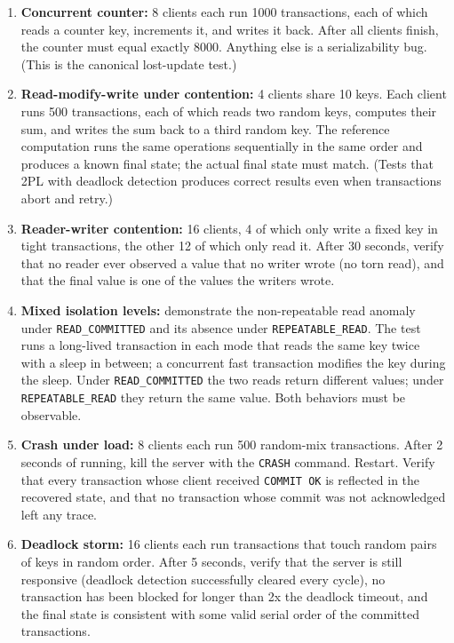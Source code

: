\documentclass[11pt,a4paper]{article}
\begin{document}
\begin{enumerate}
\item \textbf{Concurrent counter:} 8 clients each run 1000 transactions, each of which reads a counter key, increments it, and writes it back. After all clients finish, the counter must equal exactly 8000. Anything else is a serializability bug. (This is the canonical lost-update test.)

\item \textbf{Read-modify-write under contention:} 4 clients share 10 keys. Each client runs 500 transactions, each of which reads two random keys, computes their sum, and writes the sum back to a third random key. The reference computation runs the same operations sequentially in the same order and produces a known final state; the actual final state must match. (Tests that 2PL with deadlock detection produces correct results even when transactions abort and retry.)

\item \textbf{Reader-writer contention:} 16 clients, 4 of which only write a fixed key in tight transactions, the other 12 of which only read it. After 30 seconds, verify that no reader ever observed a value that no writer wrote (no torn read), and that the final value is one of the values the writers wrote.

\item \textbf{Mixed isolation levels:} demonstrate the non-repeatable read anomaly under \texttt{READ\_COMMITTED} and its absence under \texttt{REPEATABLE\_READ}. The test runs a long-lived transaction in each mode that reads the same key twice with a sleep in between; a concurrent fast transaction modifies the key during the sleep. Under \texttt{READ\_COMMITTED} the two reads return different values; under \texttt{REPEATABLE\_READ} they return the same value. Both behaviors must be observable.

\item \textbf{Crash under load:} 8 clients each run 500 random-mix transactions. After 2 seconds of running, kill the server with the \texttt{CRASH} command. Restart. Verify that every transaction whose client received \texttt{COMMIT OK} is reflected in the recovered state, and that no transaction whose commit was not acknowledged left any trace.

\item \textbf{Deadlock storm:} 16 clients each run transactions that touch random pairs of keys in random order. After 5 seconds, verify that the server is still responsive (deadlock detection successfully cleared every cycle), no transaction has been blocked for longer than 2x the deadlock timeout, and the final state is consistent with some valid serial order of the committed transactions.
\end{enumerate}
\end{document}
